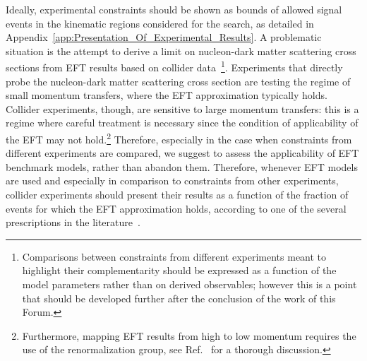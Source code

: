 Ideally, experimental constraints should be shown as bounds of allowed signal events in the kinematic regions considered for 
the search, as detailed in Appendix~\ref{app:Presentation_Of_Experimental_Results}. 
A problematic situation is the attempt to derive a limit on
nucleon-dark matter scattering cross sections from EFT results
based on collider data~\footnote{Comparisons between constraints from different experiments 
	meant to highlight their complementarity should be expressed as 
	a function of the model parameters rather than on derived observables;
	however this is a point that should be developed further after the conclusion of the work of this Forum.}. 
Experiments that directly probe the nucleon-dark matter scattering cross section 
are testing the regime of small momentum transfers, where the EFT approximation typically holds.  
Collider experiments, though, are sensitive to large momentum transfers: this is a regime where careful 
treatment is necessary since the condition of applicability of the EFT may not hold.\footnote{
Furthermore, mapping EFT results from high to low momentum requires the use of the renormalization group, 
see Ref.~\cite{Hill:2014yka,D'Eramo:2014aba} for a thorough discussion.}
Therefore, especially in the case when constraints from different experiments are compared, 
we suggest to assess the applicability of EFT benchmark models, rather than abandon them.
Therefore, whenever EFT models are used and especially in comparison to constraints from other experiments,
collider experiments should present their results as a function of the
fraction of events for which the EFT approximation holds, according to one of the several prescriptions in the 
literature~\cite{Busoni:2013lha,Busoni:2014sya,Busoni:2014haa,Aad:2015zva,Racco:2015dxa}.

